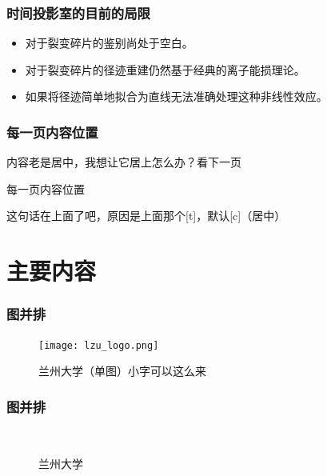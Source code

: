 \documentclass[14pt, AutoFakeBold]{ldr}
\begin{document}
\begin{frame}
  \frametitle{时间投影室的目前的局限}
  \begin{itemize}
    \item 对于裂变碎片的鉴别尚处于空白。
    \item 对于裂变碎片的径迹重建仍然基于经典的离子能损理论。
    \item 如果将径迹简单地拟合为直线无法准确处理这种非线性效应。
    \end{itemize}
  


\end{frame}



\begin{frame}
  \frametitle{每一页内容位置}

  内容老是居中，我想让它居上怎么办？看下一页


\end{frame}




\begin{frame}[t]{每一页内容位置}

  这句话在上面了吧，原因是上面那个[t]，默认[c]（居中）


\end{frame}



\section{主要内容}

\begin{frame}
  \frametitle{图并排}
  \begin{figure}[H]
    \centering
    \texttt{[image: lzu\_logo.png]}
  
    \caption{兰州大学（单图）\footnotesize 小字可以这么来}
    \label{fig_lzu}
\end{figure}
  
\end{frame}




\begin{frame}
  \frametitle{图并排}
  \begin{figure}[H]
    \centering
    \\
    \caption{兰州大学}
    \label{fig_lzus}
\end{figure}
  
\end{frame}
\end{document}
